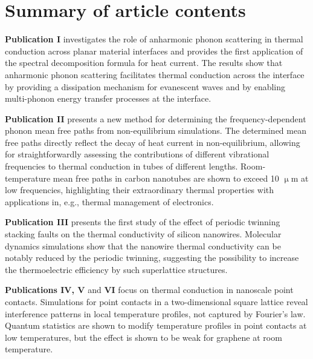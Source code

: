 \documentclass[dissertation]{aaltoseries}
\begin{document}
\tableofcontents

\listofpublications

\chapter*{Summary of article contents}

\textbf{Publication I} investigates the role of anharmonic phonon scattering in thermal conduction across planar material interfaces and provides the first application of the spectral decomposition formula for heat current. The results show that anharmonic phonon scattering facilitates thermal conduction across the interface by providing a dissipation mechanism for evanescent waves and by enabling multi-phonon energy transfer processes at the interface.

\vspace{1cm}
\noindent
\textbf{Publication II} presents a new method for determining the frequency-dependent phonon mean free paths from non-equilibrium simulations. The determined mean free paths directly reflect the decay of heat current in non-equilibrium, allowing for straightforwardly assessing the contributions of different vibrational frequencies to thermal conduction in tubes of different lengths. Room-temperature mean free paths in carbon nanotubes are shown to exceed 10 $\upmu$m at low frequencies, highlighting their extraordinary thermal properties with applications in, e.g., thermal management of electronics. 

\vspace{1cm}
\noindent
\textbf{Publication III} presents the first study of the effect of periodic twinning stacking faults on the thermal conductivity of silicon nanowires. Molecular dynamics simulations show that the nanowire thermal conductivity can be notably reduced by the periodic twinning, suggesting the possibility to increase the thermoelectric efficiency by such superlattice structures.

\vspace{1cm}
\noindent
\textbf{Publications IV, V} and \textbf{VI} focus on thermal conduction in nanoscale point contacts. Simulations for point contacts in a two-dimensional square lattice reveal interference patterns in local temperature profiles, not captured by Fourier's law. Quantum statistics are shown to modify temperature profiles in point contacts at low temperatures, but the effect is shown to be weak for graphene at room temperature.
\end{document}

